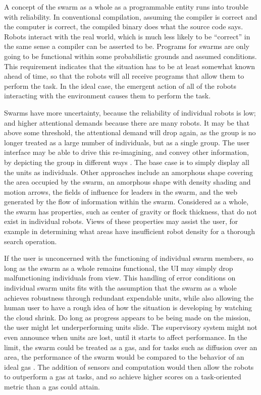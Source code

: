 \documentclass[]{article}
\begin{document}
A concept of the swarm as a whole as a programmable entity runs into trouble with reliability. 
In conventional compilation, assuming the compiler is correct and the computer is correct, the compiled binary does what the source code says. 
Robots interact with the real world, which is much less likely to be ``correct'' in the same sense a compiler can be asserted to be. 
Programs for swarms are only going to be functional within some probabilistic grounds and assumed conditions. 
This requirement indicates that the situation has to be at least somewhat known ahead of time, so that the robots will all receive programs that allow them to perform the task.
In the ideal case, the emergent action of all of the robots interacting with the environment causes them to perform the task. 

Swarms have more uncertainty, because the reliability of individual robots is low; and higher attentional demands because there are many robots. 
It may be that above some threshold, the attentional demand will drop again, as the group is no longer treated as a large number of individuals, but as a single group. 
The user interface may be able to drive this re-imagining, and convey other information, by depicting the group in different ways \cite{manning2015heuristic}.
The base case is to simply display all the units as individuals. 
Other approaches include an amorphous shape covering the area occupied by the swarm, an amorphous shape with density shading and motion arrows, the fields of influence for leaders in the swarm, and the web generated by the flow of information within the swarm. 
Considered as a whole, the swarm has properties, such as center of gravity or flock thickness, that do not exist in individual robots. 
Views of these properties may assist the user, for example in determining what areas have insufficient robot density for a thorough search operation. 

If the user is unconcerned with the functioning of individual swarm members, so long as the swarm as a whole remains functional, the UI may simply drop malfunctioning individuals from view. 
This handling of error conditions on individual swarm units fits with the assumption that the swarm as a whole achieves robustness through redundant expendable units, while also allowing the human user to have a rough idea of how the situation is developing by watching the cloud shrink. 
Do long as progress appears to be being made on the mission, the user might let underperforming units slide. 
The supervisory system might not even announce when units are lost, until it starts to affect performance.  
In the limit, the swarm could be treated as a gas, and for tasks such as diffusion over an area, the performance of the swarm would be compared to the behavior of an ideal gas \cite{jantz1997kinetics}.
The addition of sensors and computation would then allow the robots to outperform a gas at tasks, and so achieve higher scores on a task-oriented metric than a gas could attain. 
 
\end{document}
